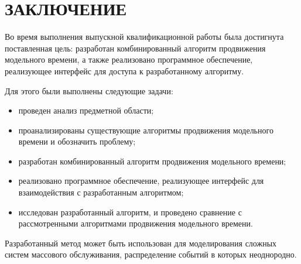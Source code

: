 \chapter*{ЗАКЛЮЧЕНИЕ}
Во время выполнения выпускной квалификационной работы была достигнута поставленная цель: разработан комбинированный алгоритм продвижения модельного времени, а также реализовано программное обеспечение, реализующее интерфейс для доступа к разработанному алгоритму.

Для этого были выполнены следующие задачи:
\begin{itemize}
	\item проведен анализ предметной области;
	\item проанализированы существующие алгоритмы продвижения модельного времени и обозначить проблему;
	\item разработан комбинированный алгоритм продвижения модельного времени;
	\item реализовано программное обеспечение, реализующее интерфейс для взаимодействия с разработанным алгоритмом;
	\item исследован разработанный алгоритм, и проведено сравнение с рассмотренными алгоритмами продвижения модельного времени.
\end{itemize}

Разработанный метод может быть использован для моделирования сложных систем массового обслуживания, распределение событий в которых неоднородно. 
